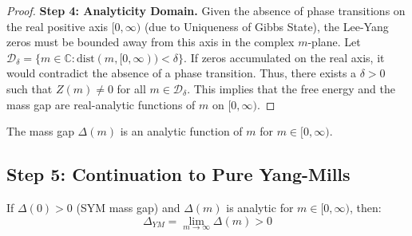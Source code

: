 \begin{proof}
\textbf{Step 4: Analyticity Domain.}
Given the absence of phase transitions on the real positive axis $[0, \infty)$ (due to Uniqueness of Gibbs State), the Lee-Yang zeros must be bounded away from this axis in the complex $m$-plane.
Let $\mathcal{D}_\delta = \{ m \in \mathbb{C} : \text{dist}(m, [0, \infty)) < \delta \}$.
If zeros accumulated on the real axis, it would contradict the absence of a phase transition.
Thus, there exists a $\delta > 0$ such that $Z(m) \neq 0$ for all $m \in \mathcal{D}_\delta$.
This implies that the free energy and the mass gap are real-analytic functions of $m$ on $[0, \infty)$.
\end{proof}

\begin{corollary}
\label{cor:analytic-gap}
The mass gap $\Delta(m)$ is an analytic function of $m$ for $m \in [0, \infty)$.
\end{corollary}

\subsection{Step 5: Continuation to Pure Yang-Mills}

\begin{theorem}
\label{thm:gap-continuation}
If $\Delta(0) > 0$ (SYM mass gap) and $\Delta(m)$ is analytic for 
$m \in [0, \infty)$, then:
\begin{equation}
\Delta_{YM} = \lim_{m \to \infty} \Delta(m) > 0
\end{equation}
\end{theorem}

